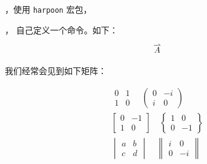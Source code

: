 

，使用 \verb|harpoon| 宏包，
\begin{texlist}
\end{texlist}



，
自己定义一个命令。如下：
\begin{texlist}
\newcommand{\myvec}[1]%
{\stackrel{\raisebox{-2pt}[0pt][0pt]
		{\small$\rightharpoonup$}}{#1}}
\[
	\myvec{A}
\]
\end{texlist}

我们经常会见到如下矩阵：
\begin{example}
\begin{gather*}
 \begin{matrix}  0 &  1 \\ 1 &  0 \end{matrix}\quad
 \begin{pmatrix} 0 & -i \\ i &  0 \end{pmatrix}\\
 \begin{bmatrix} 0 & -1 \\ 1 &  0 \end{bmatrix}\quad
 \begin{Bmatrix} 1 &  0 \\ 0 & -1 \end{Bmatrix}\\
 \begin{vmatrix} a &  b \\ c &  d \end{vmatrix}\quad
 \begin{Vmatrix} i &  0 \\ 0 & -i \end{Vmatrix}
\end{gather*}
\end{example}

